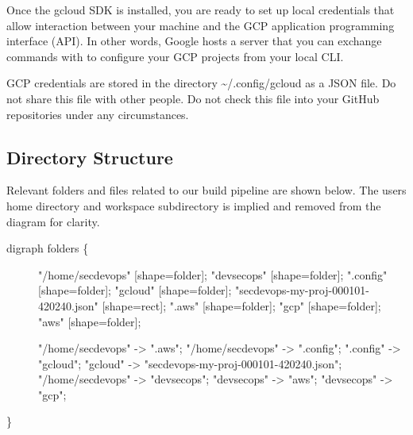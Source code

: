 Once the gcloud SDK is installed, you are ready to set up local
credentials that allow interaction between your machine and the GCP
application programming interface (API). In other words, Google hosts a
server that you can exchange commands with to configure your GCP
projects from your local CLI.

GCP credentials are stored in the directory
\textasciitilde{}/.config/gcloud as a JSON file. Do not share this file
with other people. Do not check this file into your GitHub repositories
under any circumstances.

\clearpage

\hypertarget{directory-structure}{%
\subsection{Directory Structure}\label{directory-structure}}

Relevant folders and files related to our build pipeline are shown
below. The users home directory and workspace subdirectory is implied
and removed from the diagram for clarity.

\begin{description}
\item[digraph folders \{]
"/home/secdevops" {[}shape=folder{]}; "devsecops" {[}shape=folder{]};
".config" {[}shape=folder{]}; "gcloud" {[}shape=folder{]};
"secdevops-my-proj-000101-420240.json" {[}shape=rect{]}; ".aws"
{[}shape=folder{]}; "gcp" {[}shape=folder{]}; "aws" {[}shape=folder{]};

"/home/secdevops" -\textgreater{} ".aws"; "/home/secdevops"
-\textgreater{} ".config"; ".config" -\textgreater{} "gcloud"; "gcloud"
-\textgreater{} "secdevops-my-proj-000101-420240.json";
"/home/secdevops" -\textgreater{} "devsecops"; "devsecops"
-\textgreater{} "aws"; "devsecops" -\textgreater{} "gcp";
\end{description}

\}
